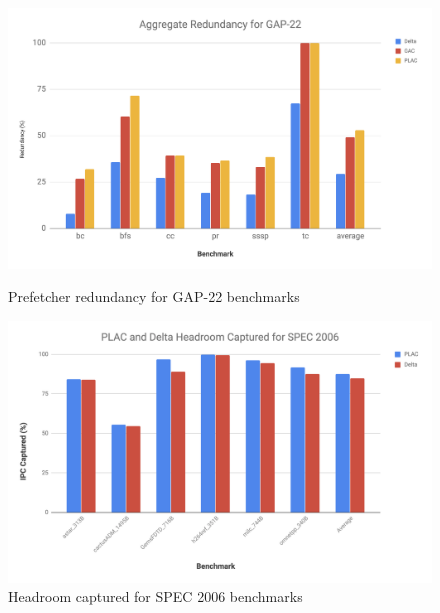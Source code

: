 \documentclass[conference]{IEEEtran}
\begin{document}
    \begin{figure}[h] %
        \centering
            \includegraphics[width=.95\textwidth]{aggregate_redundancy_gap.png}
        \caption{Prefetcher redundancy for GAP-22 benchmarks}
        \vspace*{\floatsep}
        \vspace*{\floatsep}
        \centering
            \includegraphics[width=.95\textwidth]{spec_covered.png}
        \caption{Headroom captured for SPEC 2006 benchmarks}
        \vspace*{\floatsep}
    \end{figure}
    
\end{document}
